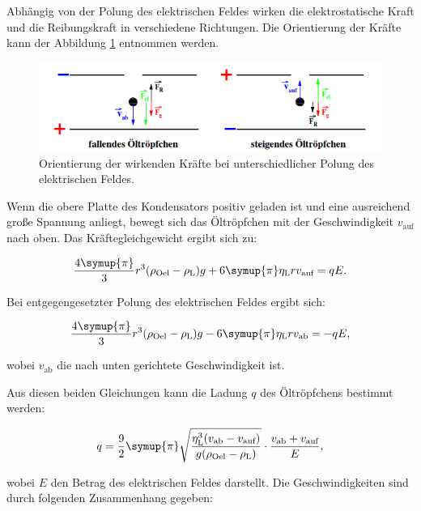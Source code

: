 Abhängig von der Polung des elektrischen Feldes wirken die elektrostatische Kraft und die Reibungskraft in verschiedene Richtungen. Die Orientierung 
der Kräfte kann der Abbildung \ref{fig:Kraeftegleichgewicht} entnommen werden.

\begin{figure}
    \centering
    \includegraphics[width = .9\textwidth]{Bilder/Kraeftegleichgewicht.png}
    \caption{Orientierung der wirkenden Kräfte bei unterschiedlicher Polung des elektrischen Feldes. \cite{1}}
    \label{fig:Kraeftegleichgewicht}
\end{figure}

Wenn die obere Platte des Kondensators positiv geladen ist und eine ausreichend große Spannung anliegt, bewegt sich das Öltröpfchen mit der 
Geschwindigkeit $v_\text{auf}$ nach oben. Das Kräftegleichgewicht ergibt sich zu:

\begin{equation*}
    \label{eqn:Kraefte_1}
    \frac{4\symup{\pi}}{3}r^3(\rho_\text{Oel} - \rho_\text{L})g + 6 \symup{\pi} \eta_\text{L}r v_\text{auf} = qE.
\end{equation*}

Bei entgegengesetzter Polung des elektrischen Feldes ergibt sich:

\begin{equation*}
    \label{eqn:Kraefte_2}
    \frac{4\symup{\pi}}{3}r^3(\rho_\text{Oel}- \rho_\text{L})g - 6 \symup{\pi} \eta_\text{L}r v_{\text{ab}} = -qE,
\end{equation*}

wobei $v_{\text{ab}}$ die nach unten gerichtete Geschwindigkeit ist.

Aus diesen beiden Gleichungen kann die Ladung $q$ des Öltröpfchens bestimmt werden:

\begin{equation}
    \label{eqn:q}
    q = \frac{9}{2} \symup{\pi} \sqrt{\frac{\eta_\text{L}^3(v_\text{ab} - v_\text{auf})}{g(\rho_\text{Oel}- \rho_\text{L})}} \cdot \frac{v_\text{ab} + v_\text{auf}}{E},
\end{equation}

wobei $E$ den Betrag des elektrischen Feldes darstellt. Die Geschwindigkeiten sind durch folgenden Zusammenhang gegeben:

